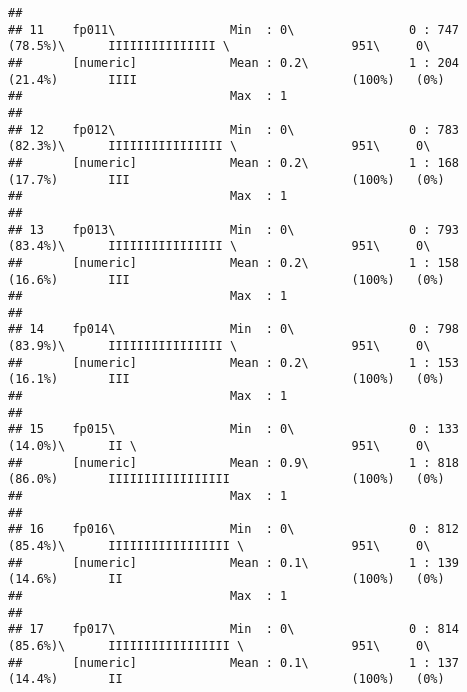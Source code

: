\documentclass[]{article}
\begin{document}
\begin{verbatim}
## 
## 11    fp011\                Min  : 0\                0 : 747 (78.5%)\      IIIIIIIIIIIIIII \                 951\     0\       
##       [numeric]             Mean : 0.2\              1 : 204 (21.4%)       IIII                              (100%)   (0%)     
##                             Max  : 1                                                                                           
## 
## 12    fp012\                Min  : 0\                0 : 783 (82.3%)\      IIIIIIIIIIIIIIII \                951\     0\       
##       [numeric]             Mean : 0.2\              1 : 168 (17.7%)       III                               (100%)   (0%)     
##                             Max  : 1                                                                                           
## 
## 13    fp013\                Min  : 0\                0 : 793 (83.4%)\      IIIIIIIIIIIIIIII \                951\     0\       
##       [numeric]             Mean : 0.2\              1 : 158 (16.6%)       III                               (100%)   (0%)     
##                             Max  : 1                                                                                           
## 
## 14    fp014\                Min  : 0\                0 : 798 (83.9%)\      IIIIIIIIIIIIIIII \                951\     0\       
##       [numeric]             Mean : 0.2\              1 : 153 (16.1%)       III                               (100%)   (0%)     
##                             Max  : 1                                                                                           
## 
## 15    fp015\                Min  : 0\                0 : 133 (14.0%)\      II \                              951\     0\       
##       [numeric]             Mean : 0.9\              1 : 818 (86.0%)       IIIIIIIIIIIIIIIII                 (100%)   (0%)     
##                             Max  : 1                                                                                           
## 
## 16    fp016\                Min  : 0\                0 : 812 (85.4%)\      IIIIIIIIIIIIIIIII \               951\     0\       
##       [numeric]             Mean : 0.1\              1 : 139 (14.6%)       II                                (100%)   (0%)     
##                             Max  : 1                                                                                           
## 
## 17    fp017\                Min  : 0\                0 : 814 (85.6%)\      IIIIIIIIIIIIIIIII \               951\     0\       
##       [numeric]             Mean : 0.1\              1 : 137 (14.4%)       II                                (100%)   (0%)     

\end{verbatim}
\end{document}
